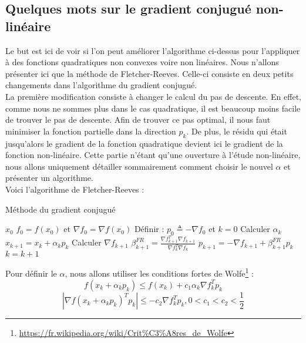 \subsection{Quelques mots sur le gradient conjugué non-linéaire}
Le but est ici de voir si l'on peut améliorer l'algorithme ci-dessus pour l'appliquer à des fonctions quadratiques non convexes voire non linéaires. Nous n'allons présenter ici que la méthode de Fletcher-Reeves. Celle-ci consiste en deux petits changements dans l'algorithme du gradient conjugué. \\

La première modification consiste à changer le calcul du pas de descente. En effet, comme nous ne sommes plus dans le cas quadratique, il est beaucoup moins facile de trouver le pas de descente. Afin de trouver ce pas optimal, il nous faut minimiser la fonction partielle dans la direction $p_k$. De plus, le résidu qui était jusqu'alors le gradient de la fonction quadratique devient ici le gradient de la fonction non-linéaire. Cette partie n'étant qu'une ouverture à l'étude non-linéaire, nous allons uniquement détailler sommairement comment choisir le nouvel $\alpha$ et présenter un algorithme.\\

\noindent Voici l'algorithme de Fletcher-Reeves : 

\begin{algorithm}[H]
	\caption{Méthode du gradient conjugué}
	\begin{algorithmic}[1]
		\Require $x_0$
		\State $f_0 = f(x_0)$ et $\nabla f_0 = \nabla f(x_0)$
		\State Définir : $p_0 \triangleq -\nabla f_0$ et $k  =0$
		\State Calculer $\alpha_k$
		\State $x_{k+1} = x_k + \alpha_k p_k$
		\State Calculer $\nabla f_{k+1}$
		\State 	$\beta^{FR}_{k+1} = \frac{\nabla f_{k+1}^T\nabla f_{k+1}}{\nabla f_k^T\nabla f_k}$
		\State $p_{k+1} = -\nabla f_{k+1}+\beta^{FR}_{k+1} p_k$
		\State $k = k+1$
		\EndWhile

	\end{algorithmic}
\end{algorithm}

Pour définir le $\alpha$, nous allons utiliser les conditions fortes de Wolfe\footnote{\url{https://fr.wikipedia.org/wiki/Crit\%C3\%A8res_de_Wolfe}} : 
\begin{equation}
f(x_k + \alpha_kp_k) \leq f(x_k) + c_1\alpha_k \nabla f_k^Tp_k
\end{equation}
\begin{equation}
|\nabla f(x_k + \alpha_kp_k)^T p_k| \leq -c_2 \nabla f_k^Tp_k, 0 < c_1 < c_2 < \frac{1}{2}
\end{equation}

